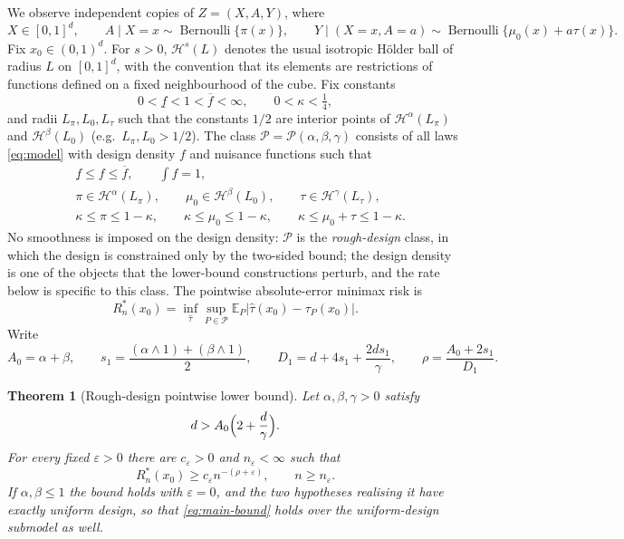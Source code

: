 \documentclass[11pt]{article}
\newtheorem{theorem}{Theorem}[section]
\newcommand{\E}{\mathbb{E}}
\newcommand{\cH}{\mathcal{H}}
\newcommand{\cP}{\mathcal{P}}
\newcommand{\abs}[1]{\lvert #1\rvert}
\begin{document}
We observe independent copies of \(Z=(X,A,Y)\), where
\begin{equation}
 X\in[0,1]^d,\qquad
 A\mid X=x\sim\operatorname{Bernoulli}\{\pi(x)\},\qquad
 Y\mid(X=x,A=a)\sim\operatorname{Bernoulli}\{\mu_0(x)+a\tau(x)\}.
 \label{eq:model}
\end{equation}
Fix \(x_0\in(0,1)^d\).  For \(s>0\), \(\cH^s(L)\) denotes the usual
isotropic Hölder ball of radius \(L\) on \([0,1]^d\), with the convention
that its elements are restrictions of functions defined on a fixed
neighbourhood of the cube.  Fix constants
\[
 0<\underline f<1<\overline f<\infty,\qquad 0<\kappa<\tfrac14,
\]
and radii \(L_\pi,L_0,L_\tau\) such that the constants \(1/2\) are interior
points of \(\cH^\alpha(L_\pi)\) and \(\cH^\beta(L_0)\) (e.g.\ \(L_\pi,L_0>1/2\)).
The class \(\cP=\cP(\alpha,\beta,\gamma)\) consists of all laws
\eqref{eq:model} with design density \(f\) and nuisance functions such that
\begin{align*}
 &\underline f\le f\le\overline f,\qquad \int f=1,\\
 &\pi\in\cH^\alpha(L_\pi),\qquad \mu_0\in\cH^\beta(L_0),\qquad \tau\in\cH^\gamma(L_\tau),\\
 &\kappa\le\pi\le1-\kappa,\qquad \kappa\le\mu_0\le1-\kappa,\qquad
 \kappa\le\mu_0+\tau\le1-\kappa .
\end{align*}
No smoothness is imposed on the design density: \(\cP\) is the
\emph{rough-design} class, in which the design is constrained only by the
two-sided bound; the design density is one of the objects that the
lower-bound constructions perturb, and the rate below is specific to
this class.  The pointwise absolute-error minimax risk is
\begin{equation}
 R^*_n(x_0)=\inf_{\widehat\tau}\sup_{P\in\cP}\E_P\abs{\widehat\tau(x_0)-\tau_P(x_0)}.
 \label{eq:risk}
\end{equation}
Write
\begin{equation}
 A_0=\alpha+\beta,\qquad
 s_1=\frac{(\alpha\wedge1)+(\beta\wedge1)}2,\qquad
 D_1=d+4s_1+\frac{2ds_1}\gamma,\qquad
 \rho=\frac{A_0+2s_1}{D_1}.
 \label{eq:rho}
\end{equation}

\begin{theorem}[Rough-design pointwise lower bound]\label{thm:main}
Let \(\alpha,\beta,\gamma>0\) satisfy
\[
 d>A_0\Bigl(2+\frac d\gamma\Bigr).
\]
For every fixed \(\varepsilon>0\) there are \(c_\varepsilon>0\) and
\(n_\varepsilon<\infty\) such that
\begin{equation}
 R^*_n(x_0)\ge c_\varepsilon n^{-(\rho+\varepsilon)},\qquad n\ge n_\varepsilon .
 \label{eq:main-bound}
\end{equation}
If \(\alpha,\beta\le1\) the bound holds with \(\varepsilon=0\), and the two
hypotheses realising it have exactly uniform design, so that
\eqref{eq:main-bound} holds over the uniform-design submodel as well.
\end{theorem}
\end{document}
